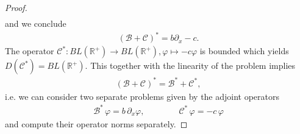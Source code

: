 \documentclass[12pt,a4paper]{amsart}
\newcommand{\BL}{\mathbf{BL}}
\newcommand{\BLN}{\mathbf{BL}}
\newcommand{\norma}[1]{{\left \|#1\right \|}}
\renewcommand{\phi}{\varphi}
\newcommand{\R}{\mathbb{R}}
\begin{document}
\begin{proof}
\begin{align*}
    \end{align*}
and we conclude
    \begin{align*}
    (\mathcal{B}+\mathcal{C})^*=b\partial_x-c.
    \end{align*}
The operator $\mathcal{C}^*:BL(\R^+)\to BL(\R^+), \varphi\mapsto -c\varphi$ is bounded which yields $D(\mathcal{C}^*)=BL(\R^+)$. This together with the linearity of the problem implies     \begin{align}\label{linearity_of_problem_adjoint}
    (\mathcal{B}+\mathcal{C})^*=\mathcal{B}^*+\mathcal{C}^*,
    \end{align}
i.e. we can consider two separate problems given by the adjoint operators
    \begin{align*}
    \mathcal{B^*}\,\phi=  b \, \partial_x \phi, \qquad \qquad
    \mathcal{C^*}\,\phi=-c\,\phi 
    \end{align*}
and compute their operator norms separately.

\end{proof}
\end{document}
